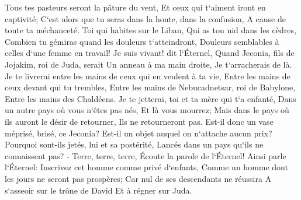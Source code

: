 \verse Tous tes pasteurs seront la pâture du vent, Et ceux qui t`aiment iront en captivité; C`est alors que tu seras dans la honte, dans la confusion, A cause de toute ta méchanceté. 
\verse Toi qui habites sur le Liban, Qui as ton nid dans les cèdres, Combien tu gémiras quand les douleurs t`atteindront, Douleurs semblables à celles d`une femme en travail! 
\verse Je suis vivant! dit l`Éternel, Quand Jeconia, fils de Jojakim, roi de Juda, serait Un anneau à ma main droite, Je t`arracherais de là. 
\verse Je te livrerai entre les mains de ceux qui en veulent à ta vie, Entre les mains de ceux devant qui tu trembles, Entre les mains de Nebucadnetsar, roi de Babylone, Entre les mains des Chaldéens. 
\verse Je te jetterai, toi et ta mère qui t`a enfanté, Dans un autre pays où vous n`êtes pas nés, Et là vous mourrez; 
\verse Mais dans le pays où ils auront le désir de retourner, Ils ne retourneront pas. 
\verse Est-il donc un vase méprisé, brisé, ce Jeconia? Est-il un objet auquel on n`attache aucun prix? Pourquoi sont-ils jetés, lui et sa postérité, Lancés dans un pays qu`ils ne connaissent pas? - 
\verse Terre, terre, terre, Écoute la parole de l`Éternel! 
\verse Ainsi parle l`Éternel: Inscrivez cet homme comme privé d`enfants, Comme un homme dont les jours ne seront pas prospères; Car nul de ses descendants ne réussira A s`asseoir sur le trône de David Et à régner sur Juda. 

